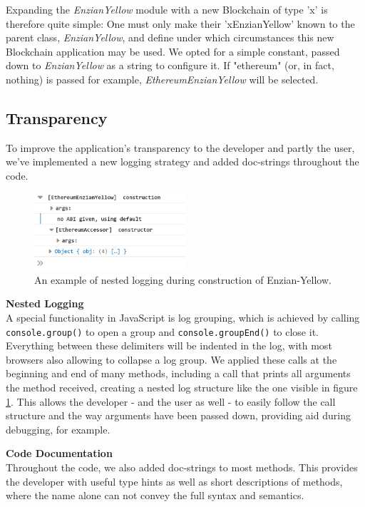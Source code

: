 Expanding the \emph{EnzianYellow} module with a new Blockchain of type 'x' is therefore quite simple: One must only make their 'xEnzianYellow' known to the parent class, \emph{EnzianYellow}, and define under which circumstances this new Blockchain application may be used. We opted for a simple constant, passed down to \emph{EnzianYellow} as a string to configure it. If "ethereum" (or, in fact, nothing) is passed for example, \emph{EthereumEnzianYellow} will be selected.

\subsection{Transparency}
\label{sec:impr:enzian:log}
To improve the application's transparency to the developer and partly the user, we've implemented a new logging strategy and added doc-strings throughout the code.

\begin{figure}[h]
	\centering
	\captionsetup{justification=centering,margin=2cm}
	\includegraphics[width=0.5\textwidth]{gfx/enzian-transparency}
	\caption{An example of nested logging during construction of Enzian-Yellow.}
	\label{fig:impr:enzian:transparency}
\end{figure}

\textbf{Nested Logging} \\[0.2em]
A special functionality in JavaScript is log grouping, which is achieved by calling \texttt{console.group()} to open a group and \texttt{console.groupEnd()} to close it. Everything between these delimiters will be indented in the log, with most browsers also allowing to collapse a log group. We applied these calls at the beginning and end of many methods, including a call that prints all arguments the method received, creating a nested log structure like the one visible in figure \ref{fig:impr:enzian:transparency}. This allows the developer - and the user as well - to easily follow the call structure and the way arguments have been passed down, providing aid during debugging, for example. 

\textbf{Code Documentation} \\[0.2em]
Throughout the code, we also added doc-strings to most methods. This provides the developer with useful type hints as well as short descriptions of methods, where the name alone can not convey the full syntax and semantics. 

